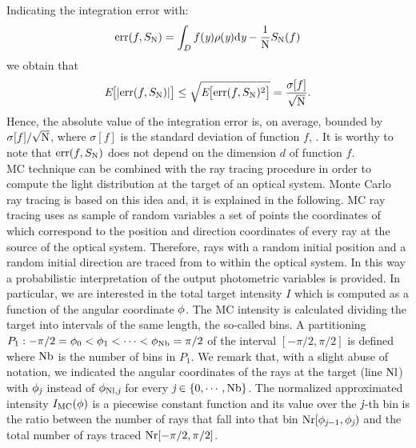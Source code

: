 Indicating the integration error with:
\begin{equation}
\textrm{err}(f, S_{\textrm{N}}) =\int_{D}f(\textit{y})\rho(\textit{y}) \textrm{d}\textit{y}-\frac{1}{\textrm{N}}S_{\textrm{N}}(f)
\end{equation}
we obtain that
\begin{equation}\label{eq:mean_error}
\textit{E}\big[|\textrm{err}(f, S_{\textrm{N}})|\big]\leq\sqrt{\textit{E}\big[\textrm{err}(f, S_{\textrm{N}})^2\big]} = \frac{\sigma[f]}{\sqrt{\textrm{N}}}.
\end{equation}
Hence, the absolute value of the integration error is, on average, bounded by $\sigma[f]/\sqrt{\textrm{N}}$, where $\sigma[f]$ is the standard deviation of function $f$, \cite{leobacher2014introduction}. It is worthy to note that $\textrm{err}(f, S_{\textrm{N}})$ does not depend on the dimension $d$ of function $f$.
\\ \indent MC technique can be combined with the ray tracing procedure in order to compute the light distribution at the target of an optical system. 
Monte Carlo ray tracing is based on this idea and, it is explained in the following. 
MC ray tracing uses as sample of random variables a set of points the coordinates of which correspond to the position and direction coordinates of every ray at the source of the optical system.
Therefore, rays with a random initial position and a random initial direction are traced from  to  within the optical system.
In this way a probabilistic interpretation of the output photometric variables is provided. 
In particular, we are interested in the total target intensity $I$ which is computed as a function of the angular coordinate $\phi$.
The MC intensity is calculated dividing the target into intervals of the same length, the so-called bins. A partitioning 
$P_1: -\pi/2 = \phi_{0}<\phi_{1}<\cdots <\phi_{\textrm{Nb}}=\pi/2$ of the interval $[-\pi/2, \pi/2]$ is defined where $\textrm{Nb}$ is the number of bins in $P_1$.
We remark that, with a slight abuse of notation, we indicated the angular coordinates of the rays at the target (line $\textrm{Nl}$) with $\phi_{\textit{j}}$ instead of $\phi_{\textrm{Nl},\textit{j}}$ for every $\textit{j}\in\{0, \cdots, \textrm{Nb}\}$.
The normalized approximated intensity $I_{\textrm{MC}}(\phi)$ is a piecewise constant function and its value over the $\textit{j}$-th bin is the ratio between the number of rays that fall into that bin
$\textrm{Nr}[\phi_{\textit{j}-1},\phi_{\textit{j}})$ and the total number of rays traced $\textrm{Nr}[-\pi/2, \pi/2]$.
